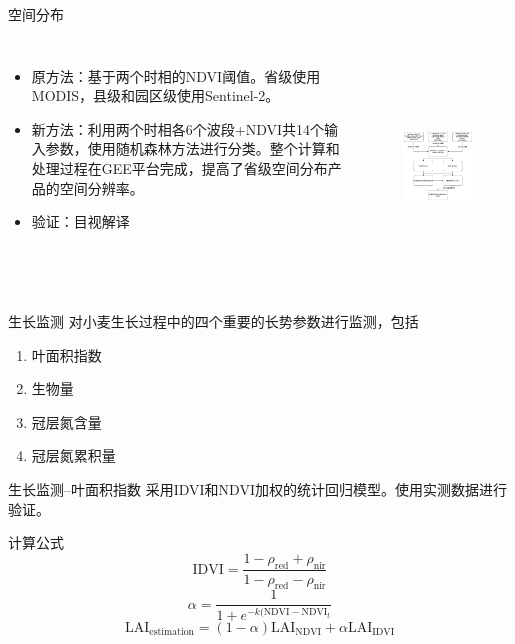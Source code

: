 \documentclass{beamer}
\begin{document}
\begin{frame}{空间分布}
\begin{columns}
\column{4.5cm}
\begin{itemize}
	\item 原方法：基于两个时相的NDVI阈值。省级使用MODIS，县级和园区级使用Sentinel-2。
	\item 新方法：利用两个时相各6个波段+NDVI共14个输入参数，使用随机森林方法进行分类。整个计算和处理过程在GEE平台完成，提高了省级空间分布产品的空间分辨率。
	\item 验证：目视解译
\end{itemize}
\column{6cm}
\begin{figure}
	\includegraphics[height=6cm]{images/area.png}
\end{figure}
\end{columns}
\end{frame}
\begin{frame}{生长监测}
对小麦生长过程中的四个重要的长势参数进行监测，包括
\begin{enumerate}
	\item 叶面积指数
	\item 生物量
	\item 冠层氮含量
	\item 冠层氮累积量
\end{enumerate}
\end{frame}
\begin{frame}{生长监测--叶面积指数}
采用IDVI和NDVI加权的统计回归模型。使用实测数据进行验证。

\begin{block}{计算公式}
	\begin{equation}
	\mathrm{IDVI}=\frac{1-\rho_{\mathrm{red}}+\rho_{\mathrm{nir}}}{1-\rho_{\mathrm{red}}-\rho_{\mathrm{nir}}}
	\end{equation}
	\begin{equation}
	\alpha=\frac{1}{1+e^{-k(\mathrm{NDVI}-\mathrm{NDVI}_t}}
	\end{equation}
	\begin{equation}
	\mathrm{LAI_{estimation}}=(1-\alpha)\mathrm{LAI_{NDVI}}+\alpha\mathrm{LAI_{IDVI}}
	\end{equation}
\end{block}

\end{frame}
\end{document}
